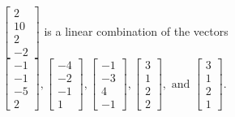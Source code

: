 \begin{exercise}
\begin{exerciseStatement}
  \end{exerciseStatement}
  \begin{exerciseAnswer}
   \(\left[\begin{array}{c}
2 \\
10 \\
2 \\
-2
\end{array}\right]\) 
  	 is  
	a linear combination of the vectors \(\left[\begin{array}{c}
-1 \\
-1 \\
-5 \\
2
\end{array}\right] , \left[\begin{array}{c}
-4 \\
-2 \\
-1 \\
1
\end{array}\right] , \left[\begin{array}{c}
-1 \\
-3 \\
4 \\
-1
\end{array}\right] , \left[\begin{array}{c}
3 \\
1 \\
2 \\
2
\end{array}\right] , \text{ and } \left[\begin{array}{c}
3 \\
1 \\
2 \\
1
\end{array}\right]\).

	
  


  \end{exerciseAnswer}
\end{exercise}